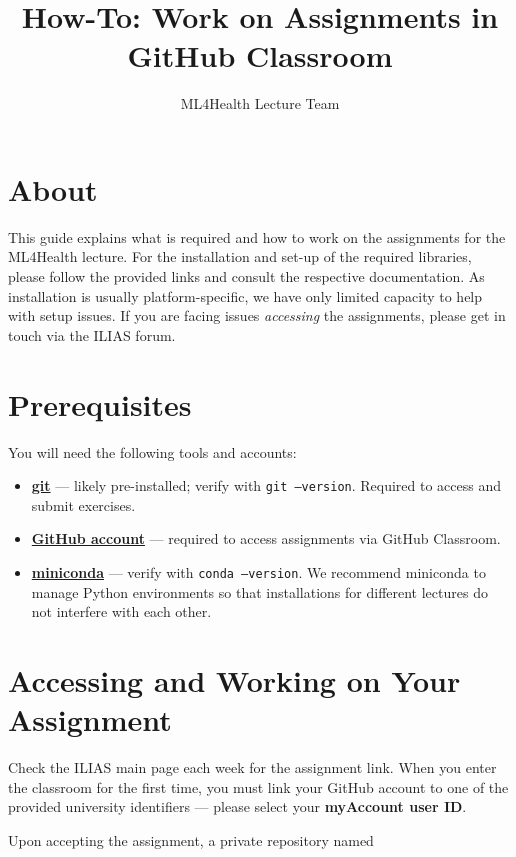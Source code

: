 \documentclass[11pt,a4paper]{article}
\title{\textbf{How-To: Work on Assignments in GitHub Classroom}}
\author{ML4Health Lecture Team}
\date{}
\begin{document}
\maketitle
\thispagestyle{fancy}

\section*{About}

This guide explains what is required and how to work on the assignments for the ML4Health lecture. For the installation and set-up of the required libraries, please follow the provided links and consult the respective documentation. As installation is usually platform-specific, we have only limited capacity to help with setup issues. If you are facing issues \emph{accessing} the assignments, please get in touch via the ILIAS forum.

\section{Prerequisites}

You will need the following tools and accounts:

\begin{itemize}[leftmargin=1.5em, itemsep=0.4em]
    \item \href{https://git-scm.com/}{\textbf{git}} — likely pre-installed; verify with \texttt{git --version}. Required to access and submit exercises.
    \item \href{https://github.com}{\textbf{GitHub account}} — required to access assignments via GitHub Classroom.
    \item \href{https://docs.anaconda.com/miniconda/}{\textbf{miniconda}} — verify with \texttt{conda --version}. We recommend miniconda to manage Python environments so that installations for different lectures do not interfere with each other.
\end{itemize}

\section{Accessing and Working on Your Assignment}

Check the ILIAS main page each week for the assignment link. When you enter the classroom for the first time, you must link your GitHub account to one of the provided university identifiers — please select your \textbf{myAccount user ID}.

Upon accepting the assignment, a private repository named
\end{document}
